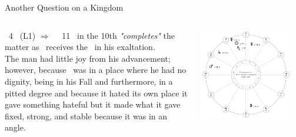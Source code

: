 \begin{frame}[t]{Another Question on a Kingdom}
\begin{columns}[T, onlytextwidth]
\Moon\ 4 \Libra\ (L1) $\Rightarrow$ \Opposition\ \Saturn\ 11 \Aries\ in the 10th \textsl{"completes"} the matter as \Saturn\ receives the \Moon\ in his exaltation. \\
\vspace{0.5cm}
The man had little joy from his advancement; however, because \Saturn\ was in a place where he had no dignity, being in his Fall and furthermore, in a pitted degree and because it hated its own place it gave something hateful but it made what it gave fixed, strong, and stable because it was in an angle.
 
\begin{center}
{\includegraphics[width=0.9\textwidth]{charts/50-chart-kingdom-1}} \\
\end{center}
\end{columns}
\end{frame}